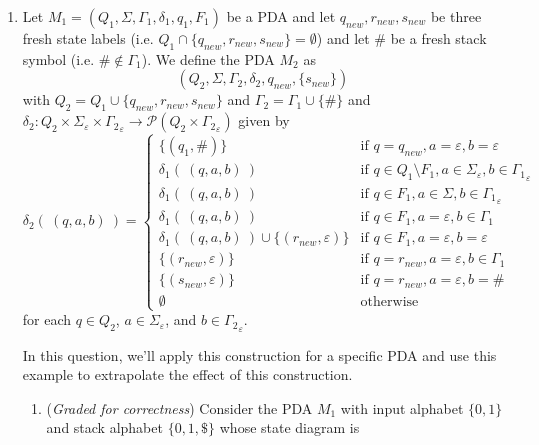 \documentclass[12pt, oneside]{article}
\newcommand{\gradeCorrect}{({\it Graded for correctness}) }
\begin{document}
\begin{enumerate}[wide, labelwidth=!, labelindent=0pt]
\begin{enumerate}
\item Let $M_1 = (Q_1, \Sigma, \Gamma_1, \delta_1, q_1, F_1)$ 
be a PDA and let $q_{new}, r_{new}, s_{new}$ be three fresh state labels 
(i.e. $Q_1 \cap \{q_{new}, r_{new}, s_{new}\} = \emptyset$) 
and let $\#$ be a fresh stack symbol (i.e. $\# \notin \Gamma_1$).
We define the PDA $M_2$ as
\[
   (Q_2, \Sigma, \Gamma_2, \delta_2, q_{new}, \{s_{new}\})
\]
with $Q_2 = Q_1 \cup \{q_{new}, r_{new}, s_{new}\}$ 
and $\Gamma_2 = \Gamma_1 \cup \{\#\}$
and 
$\delta_2 : Q_2 \times \Sigma_\varepsilon \times {\Gamma_2}_\varepsilon \to 
\mathcal{P}(Q_2 \times {\Gamma_2}_\varepsilon)$ given by 
\[
\delta_2 ( ~(q,a,b)~) = 
\begin{cases}
\{(q_1, \#)\} &\text{if } q = q_{new}, a = \varepsilon, b = \varepsilon\\
\delta_1( ~(q,a,b)~) &\text{if } q\in Q_1 \setminus F_1, a \in \Sigma_{\varepsilon}, b \in {\Gamma_1}_\varepsilon \\
\delta_1( ~(q,a,b)~) &\text{if } q\in F_1, a \in \Sigma, b \in {\Gamma_1}_\varepsilon \\
\delta_1( ~(q,a,b)~) &\text{if } q\in F_1, a =\varepsilon, b \in {\Gamma_1} \\
\delta_1( ~(q,a,b)~) \cup \{(r_{new}, \varepsilon)\} &\text{if } q\in F_1, a =\varepsilon, b =\varepsilon \\
\{(r_{new}, \varepsilon)\} &\text{if } q = r_{new}, a =\varepsilon, b \in \Gamma_{1} \\
\{(s_{new}, \varepsilon)\} &\text{if } q= r_{new}, a = \varepsilon, b = \#\\
\emptyset & \text{otherwise}
\end{cases}
\]
for each $q \in Q_2$, $a \in \Sigma_{\varepsilon}$, 
and $b \in {\Gamma_2}_\varepsilon$.

In this question, we'll apply this construction for a specific PDA and 
use this example to extrapolate the effect of this construction.
\begin{enumerate}

\item\gradeCorrect Consider the PDA $M_1$ with input alphabet $\{0,1\}$ 
and stack alphabet $\{0,1, \$\}$ whose state diagram is

\begin{center}

\end{center}
\end{enumerate}
\end{enumerate}
\end{enumerate}
\end{document}
